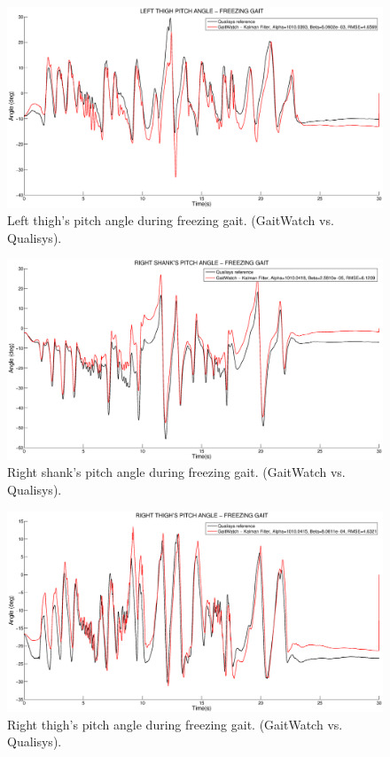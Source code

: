 \begin{figure}[H]
\centering
\includegraphics[width=1\textwidth]{figures/freezing_gait_left_thigh.eps}
\caption{Left thigh's pitch angle during freezing gait. (GaitWatch vs. Qualisys).}
\label{fig:freezing_gait_left_thigh}
\end{figure}

\begin{figure}[H]
\centering
\includegraphics[width=1\textwidth]{figures/freezing_gait_right_shank.eps}
\caption{Right shank's pitch angle during freezing gait. (GaitWatch vs. Qualisys).}
\label{fig:freezing_gait_right_shank}
\end{figure}

\begin{figure}[H]
\centering
\includegraphics[width=1\textwidth]{figures/freezing_gait_right_thigh.eps}
\caption{Right thigh's pitch angle during freezing gait. (GaitWatch vs. Qualisys).}
\label{fig:freezing_gait_right_thigh}
\end{figure}

